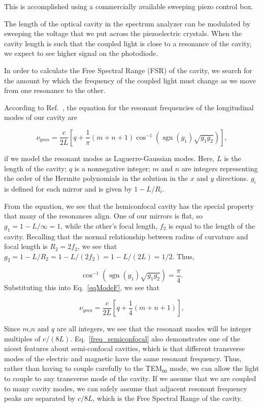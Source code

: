 This is accomplished using a commercially available sweeping piezo control box. 

The length of the optical cavity in the spectrum analyzer can be modulated by sweeping the voltage that we put across the piezoelectric crystals. When the cavity length is such that the coupled light is close to a resonance of the cavity, we expect to see higher signal on the photodiode. 

In order to calculate the Free Spectral Range (FSR) of the cavity, we search for the amount by which the frequency of the coupled light must change as we move from one resonance to the other. 

According to Ref.\ \cite{lasersMilonniEberly}, the equation for the resonant frequencies of the longitudinal modes of our cavity are

\begin{equation} \label{eqModeF}
\nu_{qmn}=\frac{c}{2L}\left[q + \frac{1}{\pi}(m+n+1)\cos^{-1}(\operatorname{sgn}(g_1)\sqrt{g_1 g_2})\right], 
\end{equation}

if we model the resonant modes as Laguerre-Gaussian modes. Here, $L$ is the length of the cavity; $q$ is a nonnegative integer; $m$ and $n$ are integers representing the order of the Hermite polynomials in the solution in the $x$ and $y$ directions. $g_i$ is defined for each mirror and is given by $1-L/R_i$.


From the equation, we see that the hemiconfocal cavity has the special property that many of the resonances align. One of our mirrors is flat, so $g_1=1-L/\infty=1$, while the other's focal length, $f_2$ is equal to the length of the cavity. Recalling that the normal relationship between radius of curvature and focal length is $R_2=2 f_2$, we see that $g_2=1-L/R_2=1-L/(2 f_2)=1-L/(2 L)=1/2$. Thus, 

\begin{equation}
\cos^{-1}(\operatorname{sgn}(g_1)\sqrt{g_1 g_2})=\frac{\pi}{4}.
\end{equation}
Substituting this into Eq.\ \ref{eqModeF}, we see that 

\begin{equation}\label{freq_semiconfocal}
\nu_{qmn}=\frac{c}{2L}\left[q + \frac{1}{4}(m+n+1)\right], 
\end{equation}

Since $m$,$n$ and $q$ are all integers, we see that the resonant modes will be integer multiples of $c/(8L)$. Eq.\ \ref{freq_semiconfocal} also demonstrates one of the nicest features about semi-confocal cavities, which is that different transverse modes of the electric and magnetic have the same resonant frequency. Thus, rather than having to couple carefully to the TEM$_{00}$ mode, we can allow the light to couple to any transverse mode of the cavity. If we assume that we are coupled to many cavity modes, we can safely assume that adjacent resonant frequency peaks are separated by $c/8L$, which is the Free Spectral Range of the cavity. 

